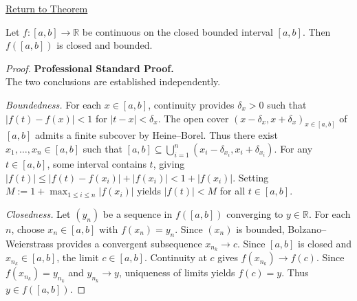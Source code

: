 \newpage
{}
\label{prf:image-closed-bounded-closed-bounded}

\begin{remark*}[Return]
\hyperref[lem:image-closed-bounded-closed-bounded]{Return to Theorem}
\end{remark*}

\begin{theorem*}
Let $f : [a,b] \to \mathbb{R}$ be continuous on the closed bounded interval $[a,b]$. Then $f([a,b])$ is closed and bounded.
\end{theorem*}

\begin{proof}
\textbf{Professional Standard Proof.}~\\
The two conclusions are established independently.

\textit{Boundedness.} For each $x \in [a,b]$, continuity provides $\delta_x > 0$ such that $|f(t) - f(x)| < 1$ for $|t - x| < \delta_x$. The open cover $(x - \delta_x, x + \delta_x)_{x \in [a,b]}$ of $[a,b]$ admits a finite subcover by Heine--Borel. Thus there exist $x_1, \ldots, x_n \in [a,b]$ such that $[a,b] \subseteq \bigcup_{i=1}^{n} (x_i - \delta_{x_i}, x_i + \delta_{x_i})$. For any $t \in [a,b]$, some interval contains $t$, giving $|f(t)| \leq |f(t) - f(x_i)| + |f(x_i)| < 1 + |f(x_i)|$. Setting $M := 1 + \max_{1 \leq i \leq n} |f(x_i)|$ yields $|f(t)| < M$ for all $t \in [a,b]$.

\textit{Closedness.} Let $(y_n)$ be a sequence in $f([a,b])$ converging to $y \in \mathbb{R}$. For each $n$, choose $x_n \in [a,b]$ with $f(x_n) = y_n$. Since $(x_n)$ is bounded, Bolzano--Weierstrass provides a convergent subsequence $x_{n_k} \to c$. Since $[a,b]$ is closed and $x_{n_k} \in [a,b]$, the limit $c \in [a,b]$. Continuity at $c$ gives $f(x_{n_k}) \to f(c)$. Since $f(x_{n_k}) = y_{n_k}$ and $y_{n_k} \to y$, uniqueness of limits yields $f(c) = y$. Thus $y \in f([a,b])$.
\end{proof}

